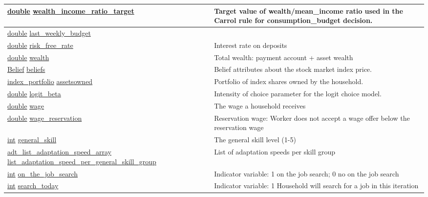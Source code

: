 \documentclass[a4paper,11pt]{article}
\begin{document}
\begin{longtable}[H!]{ll}
\midrule
\parbox{5cm}{\url{double} \url{wealth_income_ratio_target}}  & \parbox{10cm}{Target value of wealth/mean\_income ratio used in the Carrol rule for consumption\_budget decision.} \\
\midrule
\parbox{5cm}{\url{double} \url{last_weekly_budget}}  & \parbox{10cm}{} \\
\midrule
\parbox{5cm}{\url{double} \url{risk_free_rate}}  & \parbox{10cm}{Interest rate on deposits} \\
\midrule
\parbox{5cm}{\url{double} \url{wealth}}  & \parbox{10cm}{Total wealth: payment account + asset wealth} \\
\midrule
\parbox{5cm}{\url{Belief} \url{beliefs}}  & \parbox{10cm}{Belief attributes about the stock market index price.} \\
\midrule
\parbox{5cm}{\url{index_portfolio} \url{assetsowned}}  & \parbox{10cm}{Portfolio of index shares owned by the household.} \\
\midrule
\parbox{5cm}{\url{double} \url{logit_beta}}  & \parbox{10cm}{Intensity of choice parameter for the logit choice model.} \\
\midrule
\parbox{5cm}{\url{double} \url{wage}}  & \parbox{10cm}{The wage a household receives} \\
\midrule
\parbox{5cm}{\url{double} \url{wage_reservation}}  & \parbox{10cm}{Reservation wage: Worker does not accept a wage offer below the reservation wage} \\
\midrule
\parbox{5cm}{\url{int} \url{general_skill}}  & \parbox{10cm}{The general skill level (1-5)} \\
\midrule
\parbox{5cm}{\url{adt_list_adaptation_speed_array} \url{list_adaptation_speed_per_general_skill_group}}  & \parbox{10cm}{List of adaptation speeds per skill group} \\
\midrule
\parbox{5cm}{\url{int} \url{on_the_job_search}}  & \parbox{10cm}{Indicator variable: 1 on the job search; 0 no on the job search} \\
\midrule
\parbox{5cm}{\url{int} \url{search_today}}  & \parbox{10cm}{Indicator variable: 1 Household will search for a job in this iteration} \\

\end{longtable}
\end{document}
